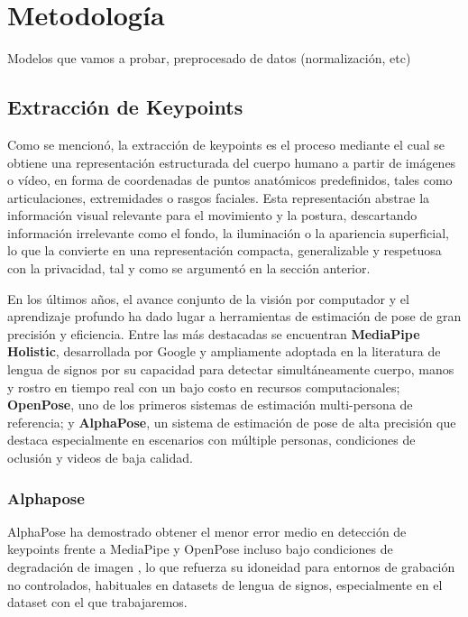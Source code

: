 \chapter{Metodología}
Modelos que vamos a probar, preprocesado de datos (normalización, etc)
\section{Extracción de Keypoints}
Como se mencionó, la extracción de keypoints es el proceso mediante el cual se obtiene una representación estructurada del cuerpo humano a partir de imágenes o vídeo, en forma de coordenadas de puntos anatómicos predefinidos, tales como articulaciones, extremidades o rasgos faciales. Esta representación abstrae la información visual relevante para el movimiento y la postura, descartando información irrelevante como el fondo, la iluminación o la apariencia superficial, lo que la convierte en una representación compacta, generalizable y respetuosa con la privacidad, tal y como se argumentó en la sección anterior.

En los últimos años, el avance conjunto de la visión por computador y el aprendizaje profundo ha dado lugar a herramientas de estimación de pose de gran precisión y eficiencia. Entre las más destacadas se encuentran \textbf{MediaPipe Holistic}, desarrollada por Google y ampliamente adoptada en la literatura de lengua de signos por su capacidad para detectar simultáneamente cuerpo, manos y rostro en tiempo real con un bajo costo en recursos computacionales; \textbf{OpenPose}, uno de los primeros sistemas de estimación multi-persona de referencia; y \textbf{AlphaPose}, un sistema de estimación de pose de alta precisión que destaca especialmente en escenarios con múltiple personas, condiciones de oclusión y videos de baja calidad.
\subsection{Alphapose}
AlphaPose ha demostrado obtener el menor error medio en detección de keypoints frente a MediaPipe y OpenPose incluso bajo condiciones de degradación de imagen \cite{info16110970}, lo que refuerza su idoneidad para entornos de grabación no controlados, habituales en datasets de lengua de signos, especialmente en el dataset con el que trabajaremos.


